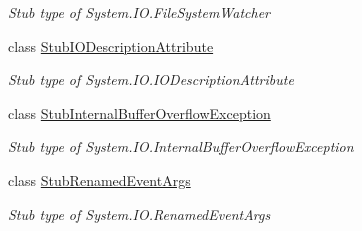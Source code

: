 \begin{DoxyCompactItemize}
\begin{DoxyCompactList}\small\item\em Stub type of System.\-I\-O.\-File\-System\-Watcher\end{DoxyCompactList}\item 
class \hyperlink{class_system_1_1_i_o_1_1_fakes_1_1_stub_i_o_description_attribute}{Stub\-I\-O\-Description\-Attribute}
\begin{DoxyCompactList}\small\item\em Stub type of System.\-I\-O.\-I\-O\-Description\-Attribute\end{DoxyCompactList}\item 
class \hyperlink{class_system_1_1_i_o_1_1_fakes_1_1_stub_internal_buffer_overflow_exception}{Stub\-Internal\-Buffer\-Overflow\-Exception}
\begin{DoxyCompactList}\small\item\em Stub type of System.\-I\-O.\-Internal\-Buffer\-Overflow\-Exception\end{DoxyCompactList}\item 
class \hyperlink{class_system_1_1_i_o_1_1_fakes_1_1_stub_renamed_event_args}{Stub\-Renamed\-Event\-Args}
\begin{DoxyCompactList}\small\item\em Stub type of System.\-I\-O.\-Renamed\-Event\-Args\end{DoxyCompactList}\end{DoxyCompactItemize}
